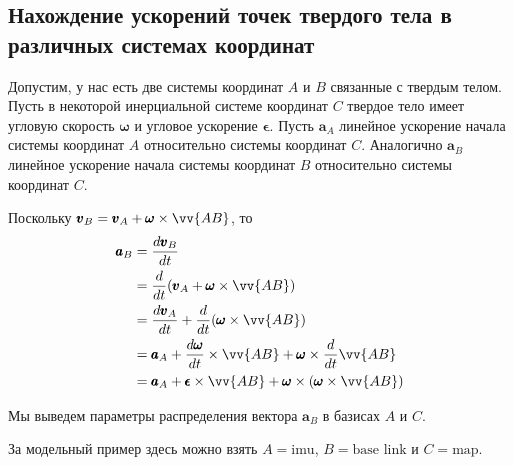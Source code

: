 \documentclass[12pt]{article}
\begin{document}
\subsection{Нахождение ускорений точек твердого тела в различных системах координат}

Допустим, у нас есть две системы координат $A$ и $B$ связанные с твердым телом.
Пусть в некоторой инерциальной системе координат $C$ твердое тело имеет
угловую скорость $\pmb{\omega}$ и угловое ускорение $\pmb{\epsilon}$.
Пусть $\pmb{a}_A$ линейное ускорение начала системы координат $A$ относительно
системы координат $C$. Аналогично $\pmb{a}_B$ линейное ускорение начала
системы координат $B$ относительно системы координат $C$.

Поскольку $\pmb{v}_B=\pmb{v}_A+\pmb{\omega} \times \vv{AB}$, то
\begin{equation}
    \begin{aligned}
        \pmb{a}_B
         & =\frac{d\pmb{v}_B}{dt}                                \\
         & =\frac{d}{dt} (\pmb{v}_A+\pmb{\omega} \times \vv{AB}) \\
         & =\frac{d \pmb{v}_A}{dt}
        + \frac{d}{dt}(\pmb{\omega} \times \vv{AB})              \\
         & =\pmb{a}_A
        + \frac{d \pmb{\omega}}{dt} \times \vv{AB}
        + \pmb{\omega} \times \frac{d}{dt} \vv{AB}               \\
         & =\pmb{a}_A + \pmb{\epsilon} \times \vv{AB}
        + \pmb{\omega} \times (\pmb{\omega} \times \vv{AB})      \\
    \end{aligned}
\end{equation}

Мы выведем параметры распределения вектора $\pmb{a}_B$ в базисах
$A$ и $C$.

За модельный пример здесь можно взять $A=\mbox{imu}$, $B=\mbox{base link}$
и $C=\mbox{map}$.
\end{document}
